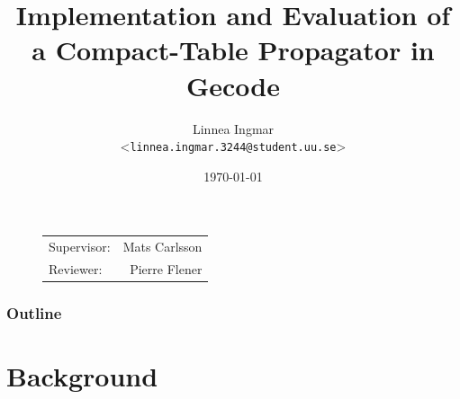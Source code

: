 \documentclass{beamer}
\title{Implementation and Evaluation of a Compact-Table Propagator in Gecode}
\author[Linnea Ingmar | \emph{linnea.ingmar.3244@student.uu.se}] %
{Linnea Ingmar \\ <\texttt{linnea.ingmar.3244@student.uu.se}>}
\institute[Dept. of Information Technology] %
{
  The ASTRA Group\\ on Combinatorial Optimisation \\
  Uppsala University
}
\date[\today] %
{\today}
\begin{document}
\begin{frame}[plain] %
  \titlepage
  
  \begin{figure}
    \begin{flushright}
        \begin{tabular}[t,right]{lr}
          Supervisor: & Mats Carlsson \\
          Reviewer:   & Pierre Flener
        \end{tabular}
      \end{flushright}
  \end{figure}

\end{frame}

\begin{frame}
    \frametitle{Outline}
    \tableofcontents[currentsection]
\end{frame}

\section{Background}

\end{document}
